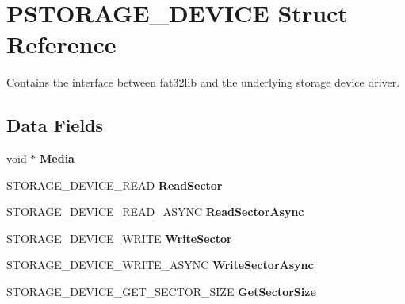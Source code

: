 \hypertarget{struct_s_t_o_r_a_g_e___d_e_v_i_c_e}{\section{P\-S\-T\-O\-R\-A\-G\-E\-\_\-\-D\-E\-V\-I\-C\-E Struct Reference}
\label{struct_s_t_o_r_a_g_e___d_e_v_i_c_e}
}


Contains the interface between fat32lib and the underlying storage device driver.  


\subsection*{Data Fields}
\begin{DoxyCompactItemize}
\item 
\hypertarget{struct_s_t_o_r_a_g_e___d_e_v_i_c_e_ab354fd5f074a07c92efd45b52678f4ba}{void $\ast$ {\bfseries Media}}\label{struct_s_t_o_r_a_g_e___d_e_v_i_c_e_ab354fd5f074a07c92efd45b52678f4ba}

\item 
\hypertarget{struct_s_t_o_r_a_g_e___d_e_v_i_c_e_abed312b19ac96c8ec9d3d8283538e8c7}{S\-T\-O\-R\-A\-G\-E\-\_\-\-D\-E\-V\-I\-C\-E\-\_\-\-R\-E\-A\-D {\bfseries Read\-Sector}}\label{struct_s_t_o_r_a_g_e___d_e_v_i_c_e_abed312b19ac96c8ec9d3d8283538e8c7}

\item 
\hypertarget{struct_s_t_o_r_a_g_e___d_e_v_i_c_e_aabed22caa922ae0b0a72fbd97b255bb9}{S\-T\-O\-R\-A\-G\-E\-\_\-\-D\-E\-V\-I\-C\-E\-\_\-\-R\-E\-A\-D\-\_\-\-A\-S\-Y\-N\-C {\bfseries Read\-Sector\-Async}}\label{struct_s_t_o_r_a_g_e___d_e_v_i_c_e_aabed22caa922ae0b0a72fbd97b255bb9}

\item 
\hypertarget{struct_s_t_o_r_a_g_e___d_e_v_i_c_e_a0f226248e6eb95ba54028a4e89dd05db}{S\-T\-O\-R\-A\-G\-E\-\_\-\-D\-E\-V\-I\-C\-E\-\_\-\-W\-R\-I\-T\-E {\bfseries Write\-Sector}}\label{struct_s_t_o_r_a_g_e___d_e_v_i_c_e_a0f226248e6eb95ba54028a4e89dd05db}

\item 
\hypertarget{struct_s_t_o_r_a_g_e___d_e_v_i_c_e_a91b0d970207b1018fa93d65798ae93ff}{S\-T\-O\-R\-A\-G\-E\-\_\-\-D\-E\-V\-I\-C\-E\-\_\-\-W\-R\-I\-T\-E\-\_\-\-A\-S\-Y\-N\-C {\bfseries Write\-Sector\-Async}}\label{struct_s_t_o_r_a_g_e___d_e_v_i_c_e_a91b0d970207b1018fa93d65798ae93ff}

\item 
\hypertarget{struct_s_t_o_r_a_g_e___d_e_v_i_c_e_aeddb41a7a53a2f24b7989a4d95b52ad6}{S\-T\-O\-R\-A\-G\-E\-\_\-\-D\-E\-V\-I\-C\-E\-\_\-\-G\-E\-T\-\_\-\-S\-E\-C\-T\-O\-R\-\_\-\-S\-I\-Z\-E {\bfseries Get\-Sector\-Size}}\label{struct_s_t_o_r_a_g_e___d_e_v_i_c_e_aeddb41a7a53a2f24b7989a4d95b52ad6}


\end{DoxyCompactItemize}
